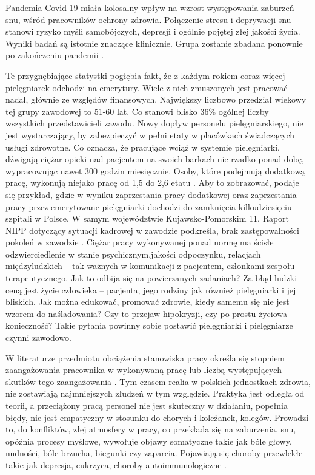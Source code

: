 \documentclass[a4paper,12pt,twoside,openany]{report}
\begin{document}
Pandemia Covid 19 miała kolosalny wpływ na wzrost występowania zaburzeń snu, wśród pracowników ochrony zdrowia. Połączenie stresu i deprywacji snu stanowi ryzyko myśli samobójczych, depresji i ogólnie pojętej złej jakości życia. Wyniki badań są istotnie znaczące klinicznie. Grupa zostanie  zbadana ponownie  po zakończeniu pandemii \cite{sen}.

Te przygnębiające statystki pogłębia fakt, że z każdym rokiem coraz więcej pielęgniarek odchodzi na emerytury. Wiele z nich zmuszonych jest pracować nadal, głównie ze względów finansowych.  Największy liczbowo przedział wiekowy tej grupy zawodowej to 51-60 lat. Co stanowi blisko 36\% ogólnej liczby wszystkich przedstawicieli zawodu. Nowy dopływ personelu pielęgniarskiego, nie jest wystarczający, by zabezpieczyć w pełni etaty w placówkach świadczących usługi zdrowotne. Co oznacza, że pracujące wciąż w systemie pielęgniarki, dźwigają ciężar opieki nad pacjentem na swoich barkach nie rzadko ponad dobę, wypracowując nawet 300 godzin miesięcznie. Osoby, które podejmują dodatkową pracę, wykonują niejako pracę od 1,5 do 2,6 etatu \cite{cyfrowe}. Aby to zobrazować, podaje się przykład, gdzie w wyniku zaprzestania pracy dodatkowej oraz zaprzestania pracy przez emerytowane pielęgniarki dochodzi do zamknięcia kilkudziesięciu szpitali w Polsce. W samym województwie Kujawsko-Pomorskim 11. Raport NIPP dotyczący sytuacji kadrowej w zawodzie podkreśla, brak zastępowalności pokoleń w zawodzie \cite{statystyka}. Ciężar pracy wykonywanej ponad normę ma ścisłe odzwierciedlenie w  stanie psychicznym,jakości  odpoczynku, relacjach międzyludzkich – tak ważnych w komunikacji z pacjentem, członkami zespołu terapeutycznego. Jak to odbija się na powierzanych zadaniach? Za błąd ludzki ceną jest życie człowieka – pacjenta, jego rodziny jak również pielęgniarki i jej bliskich. Jak można edukować, promować zdrowie, kiedy samemu się nie jest wzorem do naśladowania? Czy to przejaw hipokryzji, czy po prostu życiowa konieczność? Takie pytania powinny sobie postawić pielęgniarki i pielęgniarze czynni zawodowo.

W literaturze przedmiotu obciążenia stanowiska pracy określa się stopniem zaangażowania pracownika w wykonywaną pracę lub liczbą występujących skutków tego zaangażowania \cite{stanowisko}. Tym czasem realia w polskich jednostkach zdrowia, nie zostawiają najmniejszych złudzeń w tym względzie. Praktyka jest odległa od teorii, a przeciążony pracą personel nie jest skuteczny w działaniu, popełnia błędy, nie jest empatyczny w stosunku do chorych i koleżanek, kolegów. Prowadzi to, do konfliktów, złej atmosfery w pracy, co przekłada się na zaburzenia, snu, opóźnia procesy myślowe, wywołuje objawy somatyczne takie jak bóle głowy, nudności, bóle brzucha, biegunki czy zaparcia. Pojawiają się choroby przewlekłe takie jak depresja, cukrzyca, choroby autoimmunologiczne \cite{zdrowie}.
\end{document}
